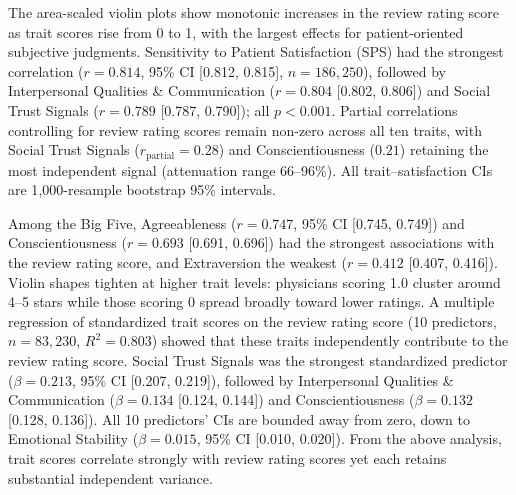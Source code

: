 %
The area-scaled violin plots show monotonic increases in the review rating score as trait scores rise from 0 to 1, with the largest effects for patient-oriented subjective judgments.
%
Sensitivity to Patient Satisfaction (SPS) had the strongest correlation ($r = 0.814$, 95\% CI [0.812, 0.815], $n = 186{,}250$), followed by Interpersonal Qualities \& Communication ($r = 0.804$ [0.802, 0.806]) and Social Trust Signals ($r = 0.789$ [0.787, 0.790]); all $p<0.001$.
%
Partial correlations controlling for review rating scores remain non-zero across all ten traits, with Social Trust Signals ($r_{\text{partial}} = 0.28$) and Conscientiousness ($0.21$) retaining the most independent signal (attenuation range 66--96\%).
%
All trait--satisfaction CIs are 1{,}000-resample bootstrap 95\% intervals.


%
Among the Big Five, Agreeableness ($r = 0.747$, 95\% CI [0.745, 0.749]) and Conscientiousness ($r = 0.693$ [0.691, 0.696]) had the strongest associations with the review rating score, and Extraversion the weakest ($r = 0.412$ [0.407, 0.416]).
%
Violin shapes tighten at higher trait levels: physicians scoring 1.0 cluster around 4--5 stars while those scoring 0 spread broadly toward lower ratings.
%
A multiple regression of standardized trait scores on the review rating score (10 predictors, $n = 83{,}230$, $R^2 = 0.803$) showed that these traits independently contribute to the review rating score.
%
Social Trust Signals was the strongest standardized predictor ($\beta = 0.213$, 95\% CI [0.207, 0.219]), followed by Interpersonal Qualities \& Communication ($\beta = 0.134$ [0.124, 0.144]) and Conscientiousness ($\beta = 0.132$ [0.128, 0.136]).
%
All 10 predictors' CIs are bounded away from zero, down to Emotional Stability ($\beta = 0.015$, 95\% CI [0.010, 0.020]).
%
From the above analysis, trait scores correlate strongly with review rating scores yet each retains substantial independent variance.
%
